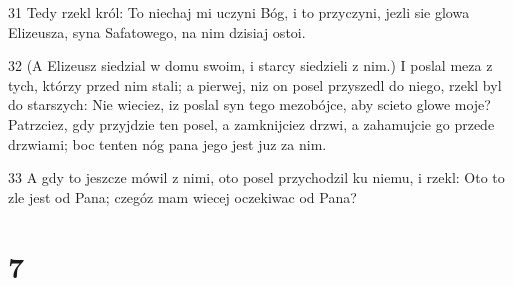 \par 31 Tedy rzekl król: To niechaj mi uczyni Bóg, i to przyczyni, jezli sie glowa Elizeusza, syna Safatowego, na nim dzisiaj ostoi.
\par 32 (A Elizeusz siedzial w domu swoim, i starcy siedzieli z nim.) I poslal meza z tych, którzy przed nim stali; a pierwej, niz on posel przyszedl do niego, rzekl byl do starszych: Nie wieciez, iz poslal syn tego mezobójce, aby scieto glowe moje? Patrzciez, gdy przyjdzie ten posel, a zamknijciez drzwi, a zahamujcie go przede drzwiami; boc tenten nóg pana jego jest juz za nim.
\par 33 A gdy to jeszcze mówil z nimi, oto posel przychodzil ku niemu, i rzekl: Oto to zle jest od Pana; czegóz mam wiecej oczekiwac od Pana?

\chapter{7}

